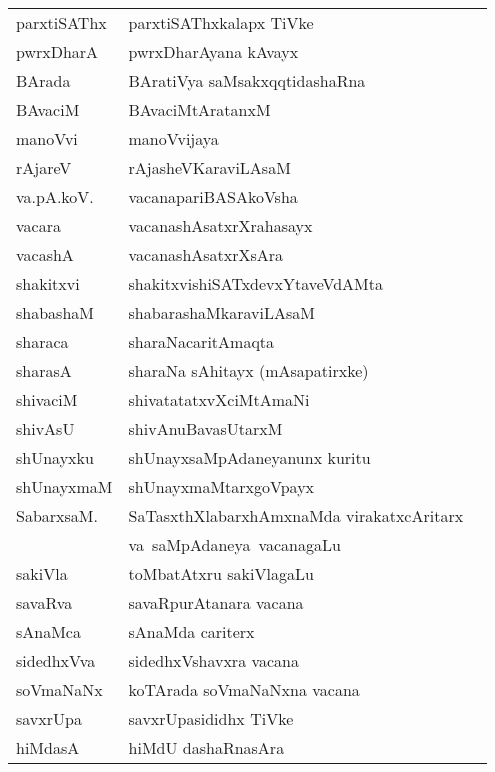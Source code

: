 {\begin{longtable}{l>{\raggedright}p{5cm}l}
parxtiSAThx & parxtiSAThxkalapx TiVke &\\
pwrxDharA & pwrxDharAyana kAvayx & \\
BArada & BAratiVya saMsakxqqtidashaRna & \\
BAvaciM & BAvaciMtAratanxM & \\
manoVvi & manoVvijaya & \\
rAjareV & rAjasheVKaraviLAsaM & \\
va.pA.koV. & vacanapariBASAkoVsha & \\
vacara & vacanashAsatxrXrahasayx & \\
vacashA & vacanashAsatxrXsAra & \\
shakitxvi & shakitxvishiSATxdevxYtaveVdAMta & \\
shabashaM & shabarashaMkaraviLAsaM & \\
sharaca & sharaNacaritAmaqta & \\
sharasA & sharaNa sAhitayx (mAsapatirxke) & \\
shivaciM & shivatatatxvXciMtAmaNi & \\
shivAsU & shivAnuBavasUtarxM & \\
shUnayxku & shUnayxsaMpAdaneyanunx kuritu &\\
shUnayxmaM & shUnayxmaMtarxgoVpayx & \\
SabarxsaM.  & SaTasxthXlabarxhAmxnaMda virakatxcAritarx & \\
            & \hbox{va saMpAdaneya vacanagaLu} &\\
sakiVla & toMbatAtxru sakiVlagaLu & \\
savaRva & savaRpurAtanara vacana & \\
sAnaMca & sAnaMda cariterx & \\
sidedhxVva & sidedhxVshavxra vacana & \\
soVmaNaNx & koTArada soVmaNaNxna vacana & \\
savxrUpa & savxrUpasididhx TiVke & \\
hiMdasA & hiMdU dashaRnasAra & \\
\hline
\end{longtable}}


